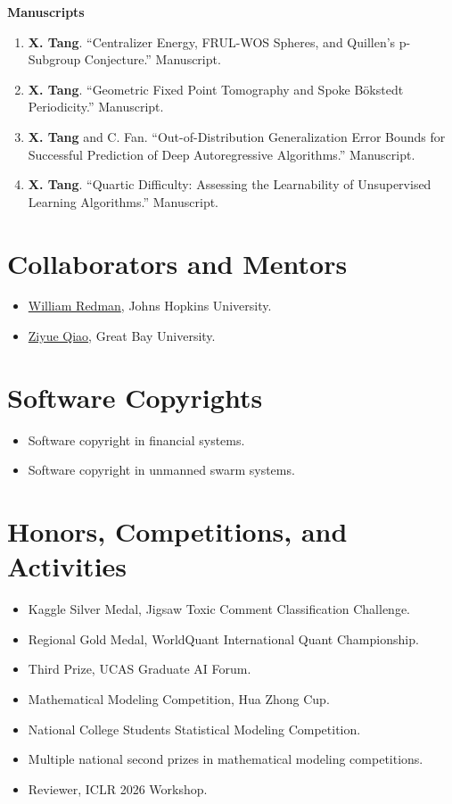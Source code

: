 \documentclass[9pt,letterpaper]{extarticle}
\newcommand{\paper}[2]{\item #1. ``#2.''}
\begin{document}
\textbf{Manuscripts}
\begin{enumerate}
  \paper{\textbf{X. Tang}}{Centralizer Energy, FRUL-WOS Spheres, and Quillen's p-Subgroup Conjecture} Manuscript.
  \paper{\textbf{X. Tang}}{Geometric Fixed Point Tomography and Spoke Bökstedt Periodicity} Manuscript.
  \paper{\textbf{X. Tang} and C. Fan}{Out-of-Distribution Generalization Error Bounds for Successful Prediction of Deep Autoregressive Algorithms} Manuscript.
  \paper{\textbf{X. Tang}}{Quartic Difficulty: Assessing the Learnability of Unsupervised Learning Algorithms} Manuscript.
\end{enumerate}

\section{Collaborators and Mentors}
\begin{itemize}
  \item \href{https://engineering.jhu.edu/faculty/william-redman/}{William Redman}, Johns Hopkins University.
  \item \href{https://qiaoziyue.com/}{Ziyue Qiao}, Great Bay University.
\end{itemize}

\section{Software Copyrights}
\begin{itemize}
  \item Software copyright in financial systems.
  \item Software copyright in unmanned swarm systems.
\end{itemize}

\section{Honors, Competitions, and Activities}
\begin{itemize}
  \item Kaggle Silver Medal, Jigsaw Toxic Comment Classification Challenge.
  \item Regional Gold Medal, WorldQuant International Quant Championship.
  \item Third Prize, UCAS Graduate AI Forum.
  \item Mathematical Modeling Competition, Hua Zhong Cup.
  \item National College Students Statistical Modeling Competition.
  \item Multiple national second prizes in mathematical modeling competitions.
  \item Reviewer, ICLR 2026 Workshop.
\end{itemize}
\end{document}
